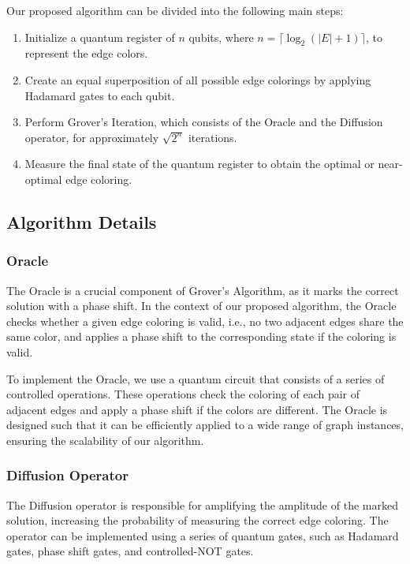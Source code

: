 Our proposed algorithm can be divided into the following main steps:

\begin{enumerate}
    \item Initialize a quantum register of $n$ qubits, where $n = \lceil \log_2 (|E| + 1) \rceil$, to represent the edge colors.
    \item Create an equal superposition of all possible edge colorings by applying Hadamard gates to each qubit.
    \item Perform Grover's Iteration, which consists of the Oracle and the Diffusion operator, for approximately $\sqrt{2^n}$ iterations.
    \item Measure the final state of the quantum register to obtain the optimal or near-optimal edge coloring.
\end{enumerate}

\subsection{Algorithm Details}\label{subsec:details}

\subsubsection{Oracle}\label{subsubsec:oracle}

The Oracle is a crucial component of Grover's Algorithm, as it marks the correct solution with a phase shift. In the context of our proposed algorithm, the Oracle checks whether a given edge coloring is valid, i.e., no two adjacent edges share the same color, and applies a phase shift to the corresponding state if the coloring is valid.

To implement the Oracle, we use a quantum circuit that consists of a series of controlled operations. These operations check the coloring of each pair of adjacent edges and apply a phase shift if the colors are different. The Oracle is designed such that it can be efficiently applied to a wide range of graph instances, ensuring the scalability of our algorithm.

\subsubsection{Diffusion Operator}\label{subsubsec:diffusion}

The Diffusion operator is responsible for amplifying the amplitude of the marked solution, increasing the probability of measuring the correct edge coloring. The operator can be implemented using a series of quantum gates, such as Hadamard gates, phase shift gates, and controlled-NOT gates.

